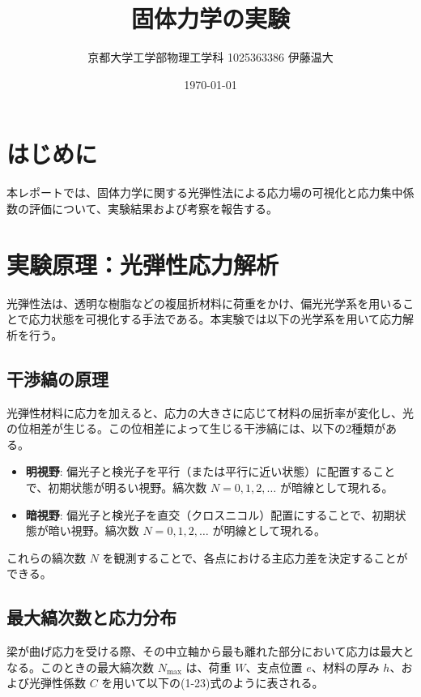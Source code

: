 \documentclass[uplatex,dvipdfmx,titlepage]{jsarticle}
\title{固体力学の実験}
\author{京都大学工学部物理工学科 1025363386 伊藤温大}
\date{\today}
\begin{document}
\maketitle

\section{はじめに}
本レポートでは、固体力学に関する光弾性法による応力場の可視化と応力集中係数の評価について、実験結果および考察を報告する。
\section{実験原理：光弾性応力解析}

光弾性法は、透明な樹脂などの複屈折材料に荷重をかけ、偏光光学系を用いることで応力状態を可視化する手法である。本実験では以下の光学系を用いて応力解析を行う。


\subsection{干渉縞の原理}
光弾性材料に応力を加えると、応力の大きさに応じて材料の屈折率が変化し、光の位相差が生じる。この位相差によって生じる干渉縞には、以下の2種類がある。

\begin{itemize}
    \item \textbf{明視野}: 偏光子と検光子を平行（または平行に近い状態）に配置することで、初期状態が明るい視野。縞次数 $N = 0, 1, 2, \dots$ が暗線として現れる。
    \item \textbf{暗視野}: 偏光子と検光子を直交（クロスニコル）配置にすることで、初期状態が暗い視野。縞次数 $N = 0, 1, 2, \dots$ が明線として現れる。
\end{itemize}

これらの縞次数 $N$ を観測することで、各点における主応力差を決定することができる。

\subsection{最大縞次数と応力分布}
梁が曲げ応力を受ける際、その中立軸から最も離れた部分において応力は最大となる。このときの最大縞次数 $N_{\text{max}}$ は、荷重 $W$、支点位置 $e$、材料の厚み $h$、および光弾性係数 $C$ を用いて以下の(1-23)式のように表される。
\end{document}
